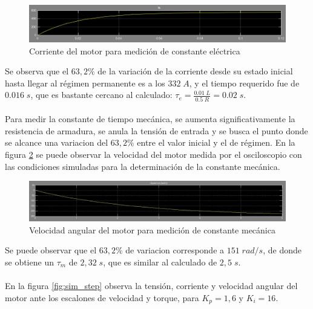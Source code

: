 \documentclass[11pt, a4paper]{article}
\begin{document}
\begin{figure}[H]
 \centering
 \includegraphics[scale=0.6]{imagenes/ia_cons_tau_e.jpg}
 \caption{Corriente del motor para medición de constante eléctrica}
 \label{fig:sim_cons_i}
\end{figure}

Se observa que el $63,2\%$ de la variación de la corriente desde su estado inicial hasta llegar al régimen permanente es a los $332\;A$, y el tiempo requerido fue de $0.016\;s$, que es bastante cercano al calculado: $\tau_e=\frac{0.01\;L}{0.5\;R}=0.02\;s$.\\\\


Para medir la constante de tiempo mecánica, se aumenta significativamente la resistencia de armadura, se anula la tensión de entrada y se busca el punto donde se alcance una variacion del $63,2\%$ entre el valor inicial y el de régimen. En la figura \ref{fig:sim_cons_w} se puede observar la velocidad del motor medida por el osciloscopio con las condiciones simuladas para la determinación de la constante mecánica.

\begin{figure}[H]
 \centering
 \includegraphics[scale=0.4]{imagenes/w_cons_tau_m.jpg}
 \caption{Velocidad angular del motor para medición de constante mecánica}
 \label{fig:sim_cons_w}
\end{figure}

Se puede observar que el $63,2\%$ de variacion corresponde a $151\;rad/s$, de donde se obtiene un $\tau_m$ de $2,32\;s$, que es similar al calculado de $2,5\;s$.\\\\


En la figura \ref{fig:sim_step} observa la tensión, corriente y velocidad angular del motor ante los escalones de velocidad y torque, para $K_p=1,6$ y $K_i=16$.
\end{document}

